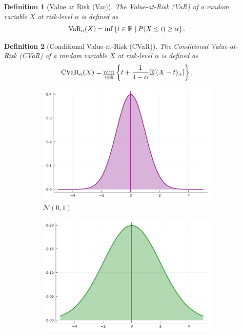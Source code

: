 \documentclass[10pt]{article}
\newtheorem{definition}{Definition}
\newcommand{\cvaralpha}{\text{CVaR}_\alpha}
\newcommand{\varalpha}{\text{VaR}_\alpha}
\theoremstyle{plain}
\theoremstyle{remark}
\begin{document}
\begin{definition}[Value at Risk (Var)]
        The Value-at-Risk (VaR) of a random variable $X$ at risk-level $\alpha$ is defined as
        $$\varalpha(X) = \inf \left\{ t \in \Real \mid P(X \leq t) \geq \alpha \right\}.$$
\end{definition}

\begin{definition}[Conditional Value-at-Risk (CVaR)]
        \label{def:cvar}
        The Conditional Value-at-Risk (CVaR) of a random variable $X$ at risk-level $\alpha$ is defined as
        $$\cvaralpha(X) = \min_{t \in \Real} \left\{ t + \frac{1}{1 - \alpha} \mathbb{E}[(X - t)_+] \right\}.$$
\end{definition}


\begin{figure}[ht!]
        \begin{subfigure}[t]{0.5\textwidth}
                \centering
                \includegraphics[width=0.7\linewidth]{julia_figures/normal.pdf}
                \caption{$\mathcal{N}(0,1)$}
                \label{fig:normal}
        \end{subfigure}
        \begin{subfigure}[t]{0.5\textwidth}
                \centering
                \includegraphics[width=0.7\linewidth]{julia_figures/normal_wide.pdf}

\end{subfigure}
\end{figure}
\end{document}
